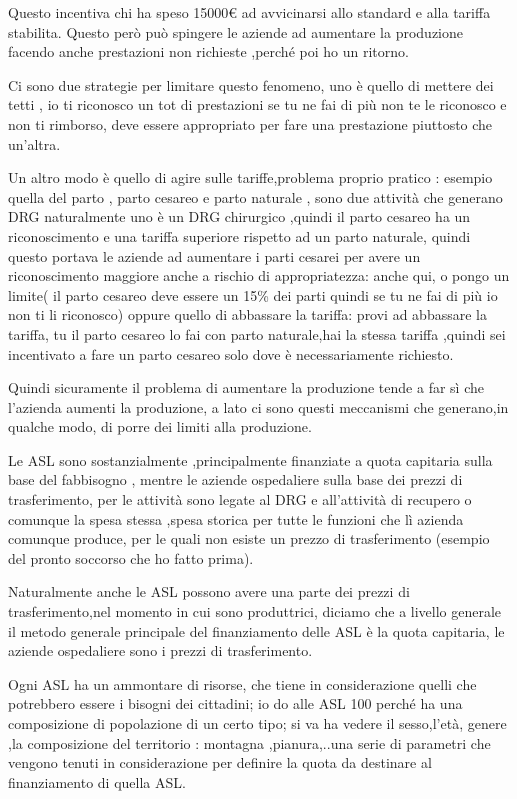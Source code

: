 \documentclass[]{article}
\newcommand{\euro}{€}
\begin{document}
Questo incentiva chi ha speso 15000\euro{} ad avvicinarsi allo standard
e alla tariffa stabilita. Questo però può spingere le aziende ad
aumentare la produzione facendo anche prestazioni non richieste ,perché
poi ho un ritorno.

Ci sono due strategie per limitare questo fenomeno, uno è quello di
mettere dei tetti , io ti riconosco un tot di prestazioni se tu ne fai
di più non te le riconosco e non ti rimborso, deve essere appropriato
per fare una prestazione piuttosto che un'altra.

Un altro modo è quello di agire sulle tariffe,problema proprio pratico :
esempio quella del parto , parto cesareo e parto naturale , sono due
attività che generano DRG naturalmente uno è un DRG chirurgico ,quindi
il parto cesareo ha un riconoscimento e una tariffa superiore rispetto
ad un parto naturale, quindi questo portava le aziende ad aumentare i
parti cesarei per avere un riconoscimento maggiore anche a rischio di
appropriatezza: anche qui, o pongo un limite( il parto cesareo deve
essere un 15\% dei parti quindi se tu ne fai di più io non ti li
riconosco) oppure quello di abbassare la tariffa: provi ad abbassare la
tariffa, tu il parto cesareo lo fai con parto naturale,hai la stessa
tariffa ,quindi sei incentivato a fare un parto cesareo solo dove è
necessariamente richiesto.

Quindi sicuramente il problema di aumentare la produzione tende a far sì
che l'azienda aumenti la produzione, a lato ci sono questi meccanismi
che generano,in qualche modo, di porre dei limiti alla produzione.

Le ASL sono sostanzialmente ,principalmente finanziate a quota capitaria
sulla base del fabbisogno , mentre le aziende ospedaliere sulla base dei
prezzi di trasferimento, per le attività sono legate al DRG e
all'attività di recupero o comunque la spesa stessa ,spesa storica per
tutte le funzioni che lì azienda comunque produce, per le quali non
esiste un prezzo di trasferimento (esempio del pronto soccorso che ho
fatto prima).

Naturalmente anche le ASL possono avere una parte dei prezzi di
trasferimento,nel momento in cui sono produttrici, diciamo che a livello
generale il metodo generale principale del finanziamento delle ASL è la
quota capitaria, le aziende ospedaliere sono i prezzi di trasferimento.

Ogni ASL ha un ammontare di risorse, che tiene in considerazione quelli
che potrebbero essere i bisogni dei cittadini; io do alle ASL 100 perché
ha una composizione di popolazione di un certo tipo; si va ha vedere il
sesso,l'età, genere ,la composizione del territorio : montagna
,pianura,..una serie di parametri che vengono tenuti in considerazione
per definire la quota da destinare al finanziamento di quella ASL.
\end{document}
